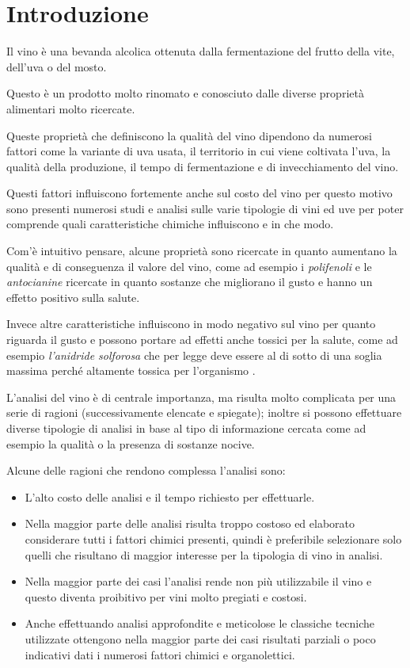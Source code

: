 \chapter{Introduzione}
\label{ch:introduzione}

Il vino è una bevanda alcolica ottenuta dalla fermentazione del frutto della vite, dell'uva o del mosto.

\noindent
Questo è un prodotto molto rinomato e conosciuto dalle diverse proprietà alimentari molto ricercate.

\noindent
Queste proprietà che definiscono la qualità del vino dipendono da numerosi fattori come la variante di uva usata, il territorio in cui viene coltivata l'uva, la qualità della produzione, il tempo di fermentazione e di invecchiamento del vino.

\noindent
Questi fattori influiscono fortemente anche sul costo del vino per questo motivo sono presenti numerosi studi e analisi sulle varie tipologie di vini ed uve per poter comprende quali caratteristiche chimiche influiscono e in che modo.

\noindent
Com'è intuitivo pensare, alcune proprietà sono ricercate in quanto aumentano la qualità e di conseguenza il valore del vino, come ad esempio i \textit{polifenoli} e le \textit{antocianine} ricercate in quanto sostanze che migliorano il gusto e hanno un effetto positivo sulla salute.

\noindent
Invece altre caratteristiche influiscono in modo negativo sul vino per quanto riguarda il gusto e possono portare ad effetti anche tossici per la salute, come ad esempio \textit{l'anidride solforosa} che per legge deve essere al di sotto di una soglia massima perché altamente tossica per l'organismo \cite{wikipedia:vino}.

\noindent
L'analisi del vino è di centrale importanza, ma risulta molto complicata per una serie di ragioni (successivamente elencate e spiegate); inoltre si possono effettuare diverse tipologie di analisi in base al tipo di informazione cercata come ad esempio la qualità o la presenza di sostanze nocive.

\noindent
Alcune delle ragioni che rendono complessa l'analisi sono:

\begin{itemize}
    \item L'alto costo delle analisi e il tempo richiesto per effettuarle.
    \item Nella maggior parte delle analisi risulta troppo costoso ed elaborato considerare tutti i fattori chimici presenti, quindi è preferibile selezionare solo quelli che risultano di maggior interesse per la tipologia di vino in analisi.
    \item Nella maggior parte dei casi l'analisi rende non più utilizzabile il vino e questo diventa proibitivo per vini molto pregiati e costosi.
    \item Anche effettuando analisi approfondite e meticolose le classiche tecniche utilizzate ottengono nella maggior parte dei casi risultati parziali o poco indicativi dati i numerosi fattori chimici e organolettici.
\end{itemize}

